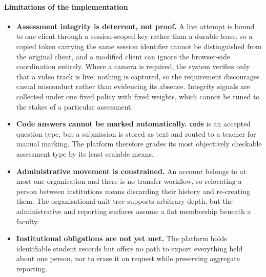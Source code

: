 \paragraph{Limitations of the implementation}
\begin{itemize}
    \item \textbf{Assessment integrity is deterrent, not proof.} A live attempt is bound to one client through a session-scoped key rather than a durable lease, so a copied token carrying the same session identifier cannot be distinguished from the original client, and a modified client can ignore the browser-side coordination entirely. Where a camera is required, the system verifies only that a video track is live; nothing is captured, so the requirement discourages casual misconduct rather than evidencing its absence. Integrity signals are collected under one fixed policy with fixed weights, which cannot be tuned to the stakes of a particular assessment.

    \item \textbf{Code answers cannot be marked automatically.} \texttt{code} is an accepted question type, but a submission is stored as text and routed to a teacher for manual marking. The platform therefore grades its most objectively checkable assessment type by its least scalable means.

    \item \textbf{Administrative movement is constrained.} An account belongs to at most one organisation and there is no transfer workflow, so relocating a person between institutions means discarding their history and re-creating them. The organisational-unit tree supports arbitrary depth, but the administrative and reporting surfaces assume a flat membership beneath a faculty.

    \item \textbf{Institutional obligations are not yet met.} The platform holds identifiable student records but offers no path to export everything held about one person, nor to erase it on request while preserving aggregate reporting.
\end{itemize}


